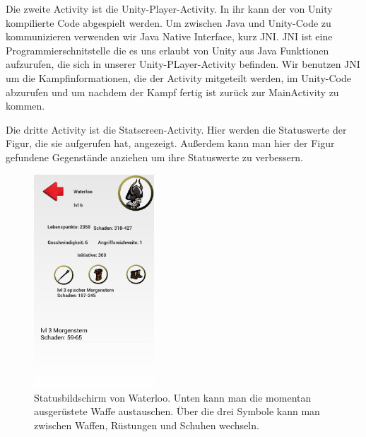 \documentclass[extern,palatino]{cgBA}
\begin{document}
Die zweite Activity ist die Unity-Player-Activity. In ihr kann der von Unity kompilierte Code abgespielt werden. Um zwischen Java und Unity-Code zu kommunizieren verwenden wir Java Native Interface, kurz JNI. JNI ist eine Programmierschnitstelle die es uns erlaubt von Unity aus Java Funktionen aufzurufen, die sich in unserer Unity-PLayer-Activity befinden. Wir benutzen JNI um die Kampfinformationen, die der Activity mitgeteilt werden, im Unity-Code abzurufen und um nachdem der Kampf fertig ist zurück zur MainActivity zu kommen.

Die dritte Activity ist die Statscreen-Activity. Hier werden die Statuswerte der Figur, die sie aufgerufen hat, angezeigt. Außerdem kann man hier der Figur gefundene Gegenstände anziehen um ihre Statuswerte zu verbessern.
\newpage
\begin{figure}[htb] 
	\centering
	\includegraphics[width=0.4\textwidth]{statscreen.png}
	\caption{Statusbildschirm von Waterloo. Unten kann man die momentan ausgerüstete Waffe austauschen. Über die drei Symbole kann man zwischen Waffen, Rüstungen und Schuhen wechseln.}
	\label{fig:Bild4}
\end{figure} 
\end{document}
